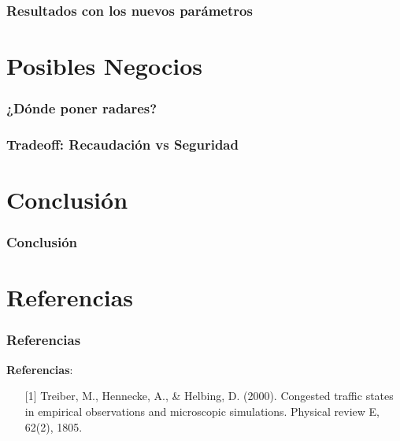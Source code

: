 \documentclass[10pt, compress]{beamer}
\begin{document}
\begin{frame}
\frametitle{Resultados con los nuevos par\'ametros}
\end{frame}

\section{Posibles Negocios}

\begin{frame}
\frametitle{¿D\'onde poner radares?}
\end{frame}

\begin{frame}
\frametitle{Tradeoff: Recaudaci\'on vs Seguridad}
\end{frame}

\section{Conclusi\'on}

\begin{frame}
\frametitle{Conclusi\'on}
\end{frame}

\section{Referencias}

\begin{frame}[fragile]

\frametitle{Referencias}

\textbf{Referencias}:
\begin{itemize}
\item [{[1]}] Treiber, M., Hennecke, A., \& Helbing, D. (2000). Congested traffic states in empirical observations and microscopic simulations. Physical review E, 62(2), 1805.
\end{itemize}

\end{frame}

\end{document}
